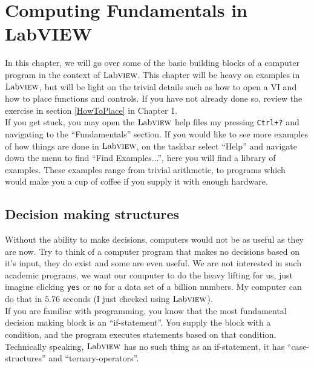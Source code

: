 \chapter{Computing Fundamentals in LabVIEW}
In this chapter, we will go over some of the basic building blocks of a computer program in the context of $\text{Lab}\textsc{view}$. This chapter will be heavy on examples in $\text{Lab}\textsc{view}$, but will be light on the trivial details such as how to open a VI and how to place functions and controls. If you have not already done so, review the exercise in section \ref{HowToPlace} in Chapter 1.\\

If you get stuck, you may open the $\text{Lab}\textsc{view}$ help files my pressing \texttt{Ctrl+?} and navigating to the ``Fundamentals'' section. If you would like to see more examples of how things are done in $\text{Lab}\textsc{view}$, on the taskbar select ``Help'' and navigate down the menu to find ``Find Examples...'', here you will find a library of examples. These examples range from trivial arithmetic, to programs which would make you a cup of coffee if you supply it with enough hardware.

\section{Decision making structures}
Without the ability to make decisions, computers would not be as useful as they are now. Try to think of a computer program that makes no decisions based on it's input, they do exist and some are even useful. We are not interested in such academic programs, we want our computer to do the heavy lifting for us, just imagine clicking \texttt{yes} or \texttt{no} for a data set of a billion numbers. My computer can do that in $5.76$ seconds (I just checked using $\text{Lab}\textsc{view}$).\\

If you are familiar with programming, you know that the most fundamental decision making block is an ``if-statement''. You supply the block with a condition, and the program executes statements based on that condition. Technically speaking, $\text{Lab}\textsc{view}$ has no such thing as an if-statement, it has ``case-structures'' and ``ternary-operators''.

